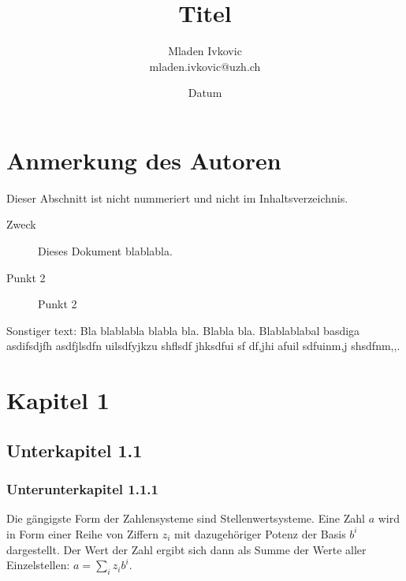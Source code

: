 \documentclass[12pt, a4paper, twopage]{scrartcl}
\title{Titel}
\author{Mladen Ivkovic\\
mladen.ivkovic@uzh.ch\\
}
\date{Datum}
\begin{document}

\maketitle
\clearpage
\tableofcontents %
\clearpage

\section*{Anmerkung des Autoren}

Dieser Abschnitt ist nicht nummeriert und nicht im Inhaltsverzeichnis. 


\begin{description}
  \item[Zweck] Dieses Dokument blablabla.
  \item[Punkt 2] Punkt 2
\end{description}

Sonstiger text: Bla blablabla blabla bla. Blabla bla. Blablablabal basdiga asdifsdjfh asdfjlsdfn uilsdfyjkzu shflsdf jhksdfui sf df,jhi afuil sdfuinm,j shsdfnm,,.
\clearpage






















\section{Kapitel 1}
\subsection{Unterkapitel 1.1}
\subsubsection{Unterunterkapitel 1.1.1}

%
%
Die gängigste Form der Zahlensysteme sind Stellenwertsysteme. Eine Zahl $a$ wird in Form einer Reihe von Ziffern $z_i$ mit dazugehöriger Potenz der Basis $b^i$ dargestellt. Der Wert der Zahl ergibt sich dann als Summe der Werte aller Einzelstellen: $a = \sum\limits_{i}z_ib^i$.
\end{document}
